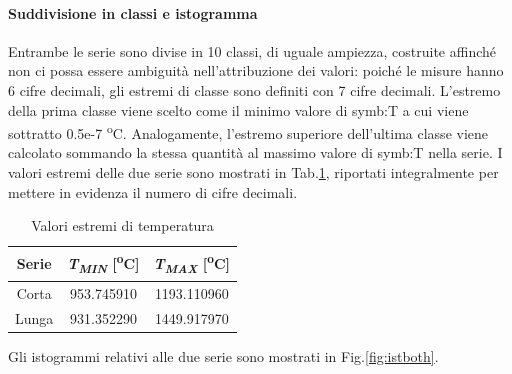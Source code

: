 \paragraph{Suddivisione in classi e istogramma}
Entrambe le serie sono divise in 10 classi, di uguale ampiezza, costruite affinché non ci possa essere ambiguità nell'attribuzione dei valori: poiché le misure hanno 6 cifre decimali, gli estremi di classe sono definiti con 7 cifre decimali. L'estremo della prima classe viene scelto come il minimo valore di \gls{symb:T} a cui viene sottratto 0.5e-7 \textsuperscript{o}C. Analogamente, l'estremo superiore dell'ultima classe viene calcolato sommando la stessa quantità al massimo valore di \gls{symb:T} nella serie. I valori estremi delle due serie sono mostrati in Tab.\ref{tab:estremitemp}, riportati integralmente per mettere in evidenza il numero di cifre decimali.
\begin{table} [H]
	\centering
	\begin{tabular}{c|c|c}
		\toprule
		\toprule
		\textbf{Serie} & \textbf{\textit{T\textsubscript{MIN}} [\textsuperscript{o}C]} &\textbf{\textit{T\textsubscript{MAX}} [\textsuperscript{o}C]} \\
		\midrule
		\midrule
		Corta & 953.745910 & 1193.110960\\
		\midrule
		Lunga & 931.352290 & 1449.917970 \\
		\bottomrule
		\bottomrule
	\end{tabular}
\caption{Valori estremi di temperatura}
\label{tab:estremitemp}
\end{table}
Gli istogrammi relativi alle due serie sono mostrati in Fig.\ref{fig:istboth}.
